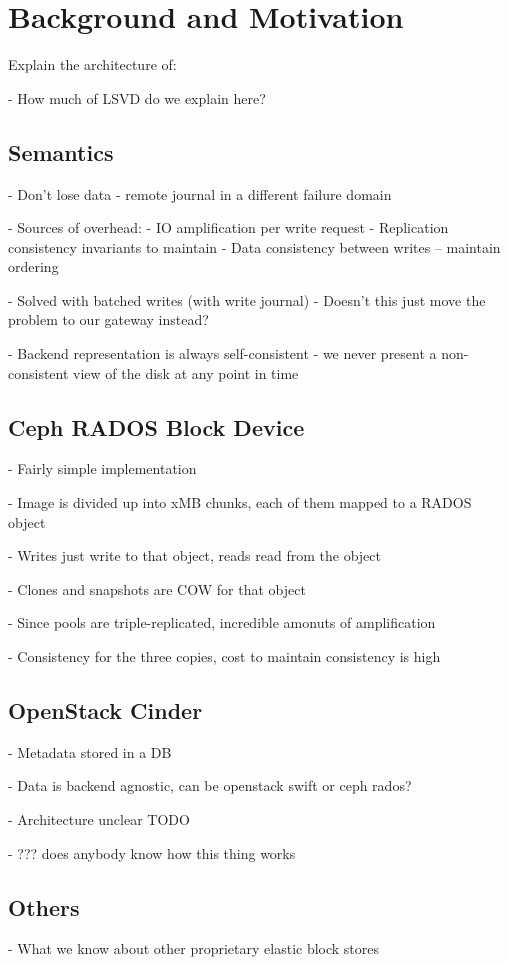 \section{Background and Motivation}

Explain the architecture of:

- How much of LSVD do we explain here?

\subsection{Semantics}

- Don't lose data - remote journal in a different failure domain

- Sources of overhead: 
    - IO amplification per write request
    - Replication consistency invariants to maintain
    - Data consistency between writes -- maintain ordering

- Solved with batched writes (with write journal)
    - Doesn't this just move the problem to our gateway instead?

- Backend representation is always self-consistent - we never present a non-consistent
  view of the disk at any point in time

\subsection{Ceph RADOS Block Device}

- Fairly simple implementation

- Image is divided up into xMB chunks, each of them mapped to a RADOS object

- Writes just write to that object, reads read from the object

- Clones and snapshots are COW for that object

- Since pools are triple-replicated, incredible amonuts of amplification

- Consistency for the three copies, cost to maintain consistency is high

\subsection{OpenStack Cinder}

- Metadata stored in a DB

- Data is backend agnostic, can be openstack swift or ceph rados?

- Architecture unclear TODO

- ??? does anybody know how this thing works

\subsection{Others}

- What we know about other proprietary elastic block stores
